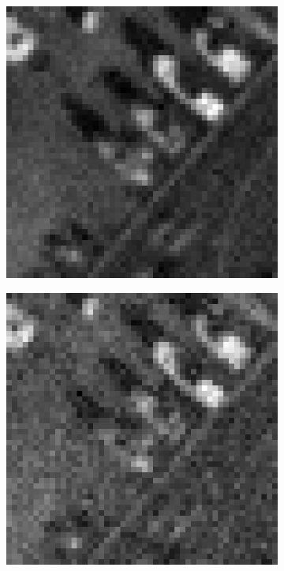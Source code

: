 \begin{figure}[htpb]
\begin{subfigure}{.25\textwidth}
\includegraphics[width=1\textwidth]{img/Im1sigma75}
\end{subfigure}%
\begin{subfigure}{.25\textwidth}
\includegraphics[width=1\textwidth]{img/Im1sigma150}

\end{subfigure}
\end{figure}
